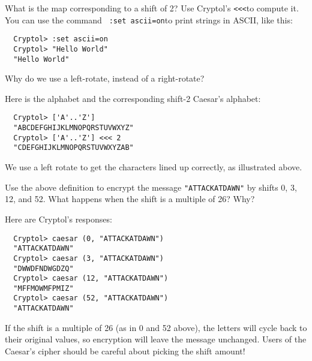 \begin{Exercise}\label{ex:caesar:0}
  What is the map corresponding to a shift of 2? Use Cryptol's
  \verb+<<<+\indRotLeft to compute it.  You can use the command {\tt
    :set ascii=on}\indSettingASCII to print strings in ASCII, like
  this:
\begin{Verbatim}
  Cryptol> :set ascii=on
  Cryptol> "Hello World"
  "Hello World"
\end{Verbatim}
Why do we use a left-rotate, instead of a right-rotate?
\end{Exercise}
\begin{Answer}
Here is the alphabet and the corresponding shift-2 Caesar's alphabet:
\begin{verbatim}
  Cryptol> ['A'..'Z']
  "ABCDEFGHIJKLMNOPQRSTUVWXYZ"
  Cryptol> ['A'..'Z'] <<< 2
  "CDEFGHIJKLMNOPQRSTUVWXYZAB"
\end{verbatim}
We use a left rotate to get the characters lined up correctly, as
illustrated above.\indRotLeft\indRotRight
\end{Answer}

\begin{Exercise}\label{ex:caesar:1}
  Use the above definition to encrypt the message {\tt "ATTACKATDAWN"}
  by shifts 0, 3, 12, and 52. What happens when the shift is a
  multiple of 26? Why?
\end{Exercise}
\begin{Answer}
Here are Cryptol's responses:
\begin{Verbatim}
  Cryptol> caesar (0, "ATTACKATDAWN")
  "ATTACKATDAWN"
  Cryptol> caesar (3, "ATTACKATDAWN")
  "DWWDFNDWGDZQ"
  Cryptol> caesar (12, "ATTACKATDAWN")
  "MFFMOWMFPMIZ"
  Cryptol> caesar (52, "ATTACKATDAWN")
  "ATTACKATDAWN"
\end{Verbatim}
If the shift is a multiple of 26 (as in 0 and 52 above), the letters
will cycle back to their original values, so encryption will leave the
message unchanged. Users of the Caesar's cipher should be careful
about picking the shift amount!
\end{Answer}

